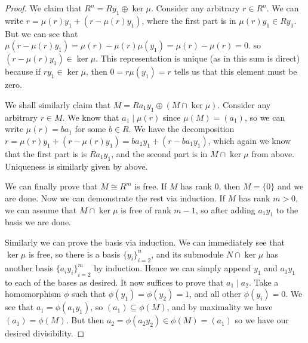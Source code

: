 \begin{proof}
    We claim that \(R^n = Ry_1 \oplus \ker\mu\).
    Consider any arbitrary \(r \in R^n\).
    We can write \(r = \mu(r)y_1 + (r - \mu(r)y_1)\),
    where the first part is in \(\mu(r)y_1 \in Ry_1\).
    But we can see that \(\mu(r-\mu(r)y_1) = \mu(r) - \mu(r)\mu(y_1) = \mu(r) - \mu(r) = 0\).
    so \((r - \mu(r)y_1) \in \ker\mu\).
    This representation is unique (as in this sum is direct)
    because if \(ry_1 \in \ker\mu\),
    then \(0 = r\mu(y_1) = r\) tells us that this element must be zero.
    
    We shall similarly claim that \(M = Ra_1y_1 \oplus (M \cap \ker\mu)\).
    Consider any arbitrary \(r \in M\).
    We know that \(a_1 \mid \mu(r)\) since \(\mu(M) = (a_1)\),
    so we can write \(\mu(r) = ba_1\) for some \(b \in R\).
    We have the decomposition \(r = \mu(r)y_1 + (r - \mu(r)y_1) = ba_1y_1 + (r-ba_1y_1)\),
    which again we know that the first part is is \(Ra_1y_1\),
    and the second part is in \(M \cap \ker\mu\) from above.
    Uniqueness is similarly given by above.

    We can finally prove that \(M \cong R^m\) is free.
    If \(M\) has rank 0, then \(M = \{0\}\) and we are done.
    Now we can demonstrate the rest via induction.
    If \(M\) has rank \(m > 0\),
    we can assume that \(M \cap \ker\mu\) is free of rank \(m-1\),
    so after adding \(a_1y_1\) to the basis we are done.

    Similarly we can prove the basis via induction.
    We can immediately see that \(\ker\mu\) is free,
    so there is a basis \({\{y_i\}}_{i=2}^n\),
    and its submodule \(N \cap \ker\mu\) has another basis \({\{a_i y_i\}}_{i=2}^m\) by induction.
    Hence we can simply append \(y_1\) and \(a_1 y_1\) to each of the bases as desired.
    It now suffices to prove that \(a_1 \mid a_2\).
    Take a homomorphism \(\phi\) such that \(\phi(y_1) = \phi(y_2) = 1\),
    and all other \(\phi(y_i) = 0\).
    We see that \(a_1 = \phi(a_1 y_1)\), so \((a_1) \subseteq \phi(M)\),
    and by maximality we have \((a_1) = \phi(M)\).
    But then \(a_2 = \phi(a_2 y_2) \in \phi(M) = (a_1)\)
    so we have our desired divisibility.
\end{proof}

